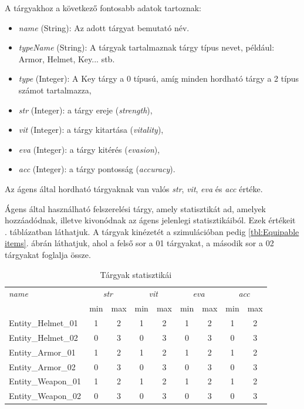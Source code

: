 
A tárgyakhoz a következő fontosabb adatok tartoznak:
\begin{itemize}
    \item \textit{name} (String): Az adott tárgyat bemutató név.
    \item \textit{typeName} (String): A tárgyak tartalmaznak tárgy típus nevet, például: Armor, Helmet, Key... stb.
    \item \textit{type} (Integer): A Key tárgy a 0 típusú, amíg minden hordható tárgy a 2 típus számot tartalmazza,
    \item \textit{str} (Integer): a tárgy ereje (\textit{strength}),
    \item \textit{vit} (Integer): a tárgy kitartása (\textit{vitality}),
    \item \textit{eva} (Integer): a tárgy kitérés (\textit{evasion}),
    \item \textit{acc} (Integer): a tárgy pontosság (\textit{accuracy}).
\end{itemize}
Az ágens által hordható tárgyaknak van valós \textit{str}, \textit{vit}, \textit{eva} és \textit{acc} értéke.


Ágens által használható felszerelési tárgy, amely statisztikát ad, amelyek hozzáadódnak, illetve kivonódnak az ágens jelenlegi statisztikáiból. Ezek értékeit . táblázatban láthatjuk. A tárgyak kinézetét a szimulációban pedig \ref{tbl:Equipable items}. ábrán láthatjuk, ahol a felső sor a 01 tárgyakat, a második sor a 02 tárgyakat foglalja össze.

\begin{table}[h!]
\centering
\caption{Tárgyak statisztikái}
\label{tab:stats}
\medskip
\begin{tabular}{|l|cc|cc|cc|cc|}
\textit{name} &
\multicolumn{2}{c|}{\textit{str}} &
\multicolumn{2}{c|}{\textit{vit}} &
\multicolumn{2}{c|}{\textit{eva}} &
\multicolumn{2}{c|}{\textit{acc}} \\
&
min & max &
min & max &
min & max &
min & max \\
\hline
Entity\_Helmet\_01 &
1 & 2 & 1 & 2 & 1 & 2 & 1 & 2 \\
Entity\_Helmet\_02 &
0 & 3 & 0 & 3 & 0 & 3 & 0 & 3 \\
Entity\_Armor\_01 &
1 & 2 & 1 & 2 & 1 & 2 & 1 & 2 \\
Entity\_Armor\_02 &
0 & 3 & 0 & 3 & 0 & 3 & 0 & 3 \\
Entity\_Weapon\_01 &
1 & 2 & 1 & 2 & 1 & 2 & 1 & 2 \\
Entity\_Weapon\_02 &
0 & 3 & 0 & 3 & 0 & 3 & 0 & 3 \\
\hline
\end{tabular}
\end{table}

